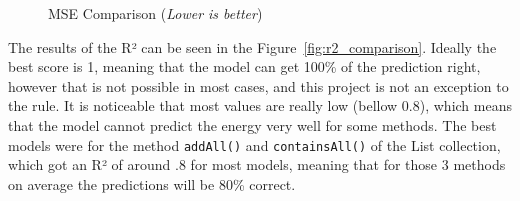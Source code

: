 \begin{figure}[htbp]
  \centering
  \caption{MSE Comparison (\textit{Lower is better})}
  \label{fig:mse_comparison}
\end{figure}

The results of the R² can be seen in the Figure~\ref{fig:r2_comparison}.
Ideally the best score is 1, meaning that the model can get 100\% of the prediction right, however that is not possible in most cases, and this project is not an exception to the rule. It is noticeable that most values are really low (bellow 0.8), which means that the model cannot predict the energy very well for some methods. The best models were for the method \texttt{addAll()} and \texttt{containsAll()} of the List collection, which got an R² of around .8 for most models, meaning that for those 3 methods on average the predictions will be 80\% correct.

